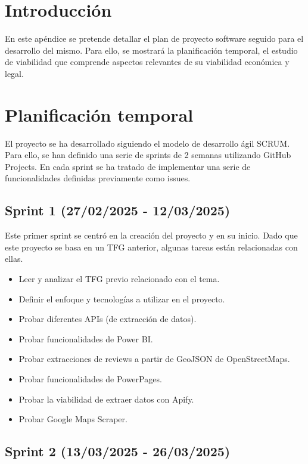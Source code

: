 
\section{Introducción}

En este apéndice se pretende detallar el plan de proyecto software seguido para el desarrollo del mismo. 
Para ello, se mostrará la planificación temporal, el estudio de viabilidad que comprende aspectos relevantes de su viabilidad económica y legal.

\section{Planificación temporal}

El proyecto se ha desarrollado siguiendo el modelo de desarrollo ágil SCRUM. Para ello, se han definido una serie de sprints de 2 semanas utilizando GitHub Projects.
En cada sprint se ha tratado de implementar una serie de funcionalidades definidas previamente como issues.

\subsection{Sprint 1 (27/02/2025 - 12/03/2025)}

Este primer sprint se centró en la creación del proyecto y en su inicio. Dado que este proyecto se basa en un TFG anterior, algunas tareas están relacionadas con ellas.

\begin{itemize}
    \item Leer y analizar el TFG previo relacionado con el tema.
    \item Definir el enfoque y tecnologías a utilizar en el proyecto.
    \item Probar diferentes APIs (de extracción de datos).
    \item Probar funcionalidades de Power BI.
    \item Probar extracciones de reviews a partir de GeoJSON de OpenStreetMaps.
    \item Probar funcionalidades de PowerPages.
    \item Probar la viabilidad de extraer datos con Apify.
    \item Probar Google Maps Scraper.
\end{itemize}

\subsection{Sprint 2 (13/03/2025 - 26/03/2025)}

